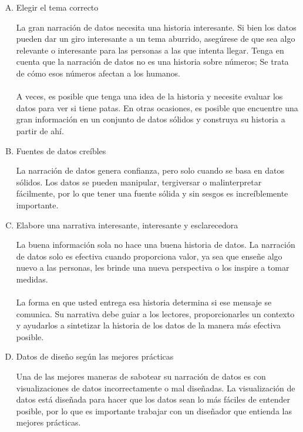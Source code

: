 \documentclass[preprint,12pt]{elsarticle}
\begin{document}
	\begin{enumerate}[A)]
		\item Elegir el tema correcto
		
		La gran narración de datos necesita una historia interesante. Si bien los datos pueden dar un giro interesante a un tema aburrido, asegúrese de que sea algo relevante o interesante para las personas a las que intenta llegar. Tenga en cuenta que la narración de datos no es una historia sobre números; Se trata de cómo esos números afectan a los humanos.\\
		\\
		A veces, es posible que tenga una idea de la historia y necesite evaluar los datos para ver si tiene patas. En otras ocasiones, es posible que encuentre una gran información en un conjunto de datos sólidos y construya su historia a partir de ahí.\\
		
		\item Fuentes de datos creíbles
		
		La narración de datos genera confianza, pero solo cuando se basa en datos sólidos. Los datos se pueden manipular, tergiversar o malinterpretar fácilmente, por lo que tener una fuente sólida y sin sesgos es increíblemente importante.\\
		
		\item Elabore una narrativa interesante, interesante y esclarecedora
		
		La buena información sola no hace una buena historia de datos. La narración de datos solo es efectiva cuando proporciona valor, ya sea que enseñe algo nuevo a las personas, les brinde una nueva perspectiva o los inspire a tomar medidas.\\
		\\
		La forma en que usted entrega esa historia determina si ese mensaje se comunica. Su narrativa debe guiar a los lectores, proporcionarles un contexto y ayudarlos a sintetizar la historia de los datos de la manera más efectiva posible.\\
		
		\item Datos de diseño según las mejores prácticas
		
		Una de las mejores maneras de sabotear su narración de datos es con visualizaciones de datos incorrectamente o mal diseñadas. La visualización de datos está diseñada para hacer que los datos sean lo más fáciles de entender posible, por lo que es importante trabajar con un diseñador que entienda las mejores prácticas.
		
	\end{enumerate}
	
\end{document}
